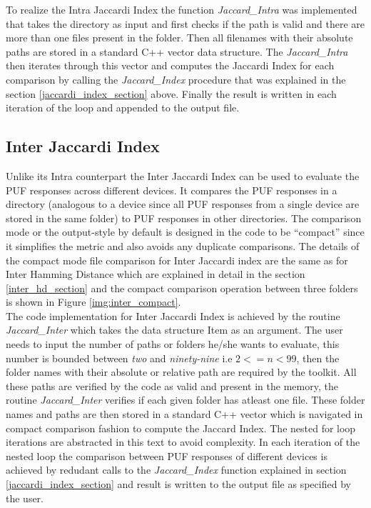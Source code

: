 To realize the Intra Jaccardi Index the function \emph{Jaccard\_Intra} was implemented that takes the directory as input and first checks if the path is valid and there are more than one files present in the folder. Then all filenames with their absolute paths are stored in a standard C++ vector data structure. The \emph{Jaccard\_Intra} then iterates through this vector and computes the Jaccardi Index for each comparison by calling the \emph{Jaccard\_Index} procedure that was explained in the section
\ref{jaccardi_index_section}
above. Finally the result is written in each iteration of the loop and appended to the output file.\\

\subsection{Inter Jaccardi Index}
Unlike its Intra counterpart the Inter Jaccardi Index can be used to evaluate the PUF responses across different devices. It compares the PUF responses in a directory (analogous to a device since all PUF responses from a single device are stored in the same folder) to PUF responses in other directories. The comparison mode or the output-style by default is designed in the code to be ``compact'' since it simplifies the metric and also avoids any duplicate comparisons. The details of
the compact mode file comparison for Inter Jaccardi index are the same as for Inter Hamming Distance which are explained in detail in the section \ref{inter_hd_section} and the  compact comparison operation between three folders is shown in Figure \ref{img:inter_compact}.\\

The code implementation for Inter Jaccardi Index is achieved by the routine \emph{Jaccard\_Inter} which takes the data structure Item as an argument. The user needs to input the number of paths or folders he/she wants to evaluate, this number is bounded between \emph{two} and \emph{ninety-nine} i.e $2 <= n < 99$, then the folder names with their absolute or relative path are required by the toolkit. All these paths are verified by the code as valid and present in the memory, the
routine \emph{Jaccard\_Inter} verifies if each given folder has atleast one file. These folder names and paths are then stored in a standard C++ vector which is navigated in compact comparison fashion to compute the Jaccard Index. The nested for loop iterations are abstracted in this text to avoid complexity. In each iteration of the nested loop the comparison between PUF responses of different devices is achieved by redudant calls to the \emph{Jaccard\_Index} function explained in section
\ref{jaccardi_index_section} and result is written to the output file as specified by the user.\\

